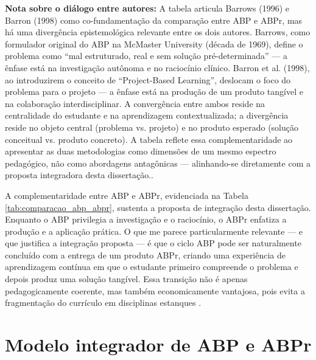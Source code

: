 \begin{table}[htbp]
    \footnotesize{\textbf{Nota sobre o diálogo entre autores:} A tabela articula Barrows (1996) e Barron (1998) como co-fundamentação da comparação entre ABP e ABPr, mas há uma divergência epistemológica relevante entre os dois autores. Barrows, como formulador original do ABP na McMaster University (década de 1969), define o problema como ``mal estruturado, real e sem solução pré-determinada'' — a ênfase está na investigação autônoma e no raciocínio clínico. Barron et al. (1998), ao introduzirem o conceito de ``Project-Based Learning'', deslocam o foco do problema para o projeto — a ênfase está na produção de um produto tangível e na colaboração interdisciplinar. A convergência entre ambos reside na centralidade do estudante e na aprendizagem contextualizada; a divergência reside no objeto central (problema vs. projeto) e no produto esperado (solução conceitual vs. produto concreto). A tabela reflete essa complementaridade ao apresentar as duas metodologias como dimensões de um mesmo espectro pedagógico, não como abordagens antagônicas — alinhando-se diretamente com a proposta integradora desta dissertação.}.
\end{table}

A complementaridade entre ABP e ABPr, evidenciada na Tabela \ref{tab:comparacao_abp_abpr}, sustenta a proposta de integração desta dissertação. Enquanto o ABP privilegia a investigação e o raciocínio, o ABPr enfatiza a produção e a aplicação prática. O que me parece particularmente relevante — e que justifica a integração proposta — é que o ciclo ABP pode ser naturalmente concluído com a entrega de um produto ABPr, criando uma experiência de aprendizagem contínua em que o estudante primeiro compreende o problema e depois produz uma solução tangível. Essa transição não é apenas pedagogicamente coerente, mas também economicamente vantajosa, pois evita a fragmentação do currículo em disciplinas estanques \cite{BACICH2018}.

\section{Modelo integrador de ABP e ABPr}
\label{sec:modelo_integrador}

